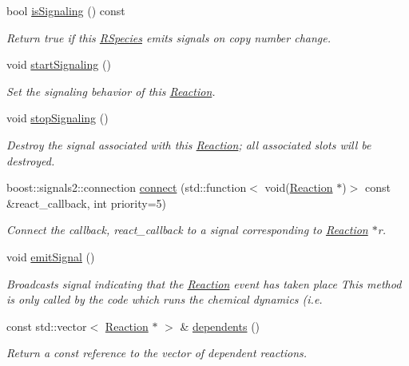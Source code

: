 \begin{DoxyCompactItemize}
bool \hyperlink{classchem_1_1Reaction_a316db368606eb9aaf47dfbde6d48f606}{is\-Signaling} () const 
\begin{DoxyCompactList}\small\item\em Return true if this \hyperlink{classchem_1_1RSpecies}{R\-Species} emits signals on copy number change. \end{DoxyCompactList}\item 
void \hyperlink{classchem_1_1Reaction_a584613fe0d634660a1814744c76a4208}{start\-Signaling} ()
\begin{DoxyCompactList}\small\item\em Set the signaling behavior of this \hyperlink{classchem_1_1Reaction}{Reaction}. \end{DoxyCompactList}\item 
void \hyperlink{classchem_1_1Reaction_ace48838b7b1bac957e840ad7b2f4a4e1}{stop\-Signaling} ()
\begin{DoxyCompactList}\small\item\em Destroy the signal associated with this \hyperlink{classchem_1_1Reaction}{Reaction}; all associated slots will be destroyed. \end{DoxyCompactList}\item 
boost\-::signals2\-::connection \hyperlink{classchem_1_1Reaction_af427c88bd882105d317f99d5a9f4a34d}{connect} (std\-::function$<$ void(\hyperlink{classchem_1_1Reaction}{Reaction} $\ast$)$>$ const \&react\-\_\-callback, int priority=5)
\begin{DoxyCompactList}\small\item\em Connect the callback, react\-\_\-callback to a signal corresponding to \hyperlink{classchem_1_1Reaction}{Reaction} $\ast$r. \end{DoxyCompactList}\item 
void \hyperlink{classchem_1_1Reaction_ab76db5606306efa0772f7833a5f2ce68}{emit\-Signal} ()
\begin{DoxyCompactList}\small\item\em Broadcasts signal indicating that the \hyperlink{classchem_1_1Reaction}{Reaction} event has taken place This method is only called by the code which runs the chemical dynamics (i.\-e. \end{DoxyCompactList}\item 
const std\-::vector$<$ \hyperlink{classchem_1_1Reaction}{Reaction} $\ast$ $>$ \& \hyperlink{classchem_1_1Reaction_af001778d48ac0800beba1b7031aeab33}{dependents} ()
\begin{DoxyCompactList}\small\item\em Return a const reference to the vector of dependent reactions. \end{DoxyCompactList}\item 

\end{DoxyCompactItemize}
